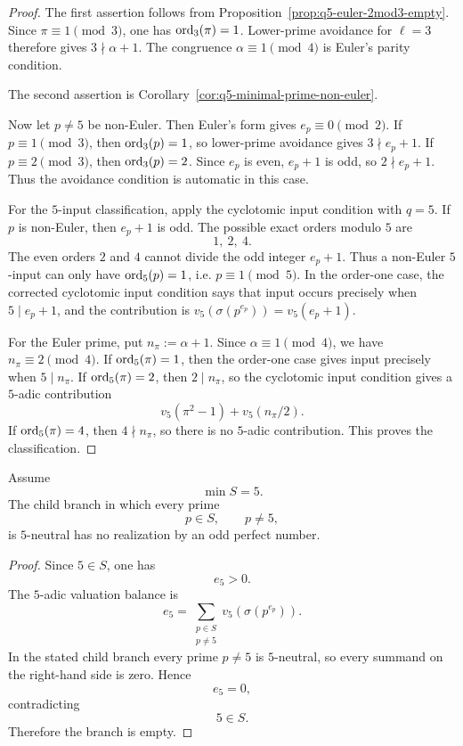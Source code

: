 \begin{proof}
The first assertion follows from
Proposition~\ref{prop:q5-euler-2mod3-empty}.  Since $\pi\equiv1\pmod3$, one has
\(\operatorname{ord}_3(\pi)=1\).  Lower-prime avoidance for \(\ell=3\) therefore gives
\(3\nmid\alpha+1\).  The congruence \(\alpha\equiv1\pmod4\) is Euler's parity
condition.

The second assertion is Corollary~\ref{cor:q5-minimal-prime-non-euler}.

Now let $p\ne5$ be non-Euler.  Then Euler's form gives
\(e_p\equiv0\pmod2\).
If $p\equiv1\pmod3$, then $\operatorname{ord}_3(p)=1$, so lower-prime avoidance gives
\(3\nmid e_p+1\).
If $p\equiv2\pmod3$, then $\operatorname{ord}_3(p)=2$.  Since $e_p$ is even,
\(e_p+1\) is odd, so \(2\nmid e_p+1\).
Thus the avoidance condition is automatic in this case.

For the $5$-input classification, apply the cyclotomic input condition with
$q=5$.  If $p$ is non-Euler, then $e_p+1$ is odd.  The possible exact orders
modulo $5$ are
\[
  1,\ 2,\ 4.
\]
The even orders $2$ and $4$ cannot divide the odd integer $e_p+1$.  Thus a
non-Euler \(5\)-input can only have \(\operatorname{ord}_5(p)=1\), i.e.
\(p\equiv1\pmod5\).
In the order-one case, the corrected cyclotomic input condition says that input
occurs precisely when \(5\mid e_p+1\), and the contribution is
\(v_5(\sigma(p^{e_p}))=v_5(e_p+1)\).

For the Euler prime, put \(n_\pi:=\alpha+1\).  Since
\(\alpha\equiv1\pmod4\), we have \(n_\pi\equiv2\pmod4\).
If $\operatorname{ord}_5(\pi)=1$, then the order-one case gives input precisely when
\(5\mid n_\pi\).
If $\operatorname{ord}_5(\pi)=2$, then $2\mid n_\pi$, so the cyclotomic input condition gives
a $5$-adic contribution
\[
  v_5(\pi^2-1)+v_5(n_\pi/2).
\]
If $\operatorname{ord}_5(\pi)=4$, then $4\nmid n_\pi$, so there is no $5$-adic contribution.
This proves the classification.
\end{proof}

\begin{corollary}[Closed $q=5$ leaf: no $5$-input prime]
\label{cor:q5-no-input-leaf-empty}
Assume
\[
  \min S=5.
\]
The child branch in which every prime
\[
  p\in S,\qquad p\ne5,
\]
is $5$-neutral has no realization by an odd perfect number.
\end{corollary}

\begin{proof}
Since $5\in S$, one has
\[
  e_5>0.
\]
The $5$-adic valuation balance is
\[
  e_5
  =
  \sum_{\substack{p\in S\\p\ne5}}
  v_5(\sigma(p^{e_p})).
\]
In the stated child branch every prime $p\ne5$ is $5$-neutral, so every summand
on the right-hand side is zero.  Hence
\[
  e_5=0,
\]
contradicting
\[
  5\in S.
\]
Therefore the branch is empty.
\end{proof}


